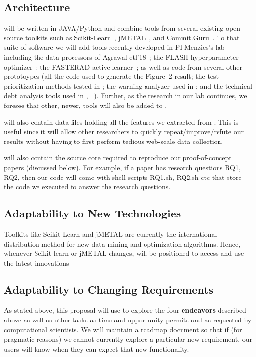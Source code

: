 \subsection{Architecture}   {\IT} will be written in JAVA/Python and 
combine tools from several existing open source toolkits such as 
Scikit-Learn~\cite{scikit-learn}, jMETAL~\cite{durillo2011jmetal}, and Commit.Guru~\cite{commitguru}.
To that suite of software we will add tools recently developed in PI Menzies's lab including
the data processors of Agrawal etl'18~\cite{agrawal2017better}; 
the FLASH hyperparameter  optimizer~\cite{nair2017flash};
the FASTERAD active learner~\cite{Yu:2018,Yu2019}; as well as code
from several other prototoypes (all the code used to generate the    Figure~2 result;
the test prioritization methods tested in ;  
the warning analyzer used in    ;  
and the technical debt analysis tools used in ,
~\cite{xia19}). Further, as the research in our lab continues,
we foresee that other, newer, tools will also be added to {\IT}.





{\IT} will also contain data files holding all the features we extracted from . This is useful
since it will allow other researchers to quickly repeat/improve/refute our results without having
to first perform tedious web-scale data collection.

{\IT} will also contain the source core required to reproduce 
our proof-of-concept papers (discussed below). For example, if  a  paper
has research questions RQ1, RQ2, then our code will come with shell scripts
 RQ1.sh, RQ2.sh etc that store the code we executed to answer the research questions.


\subsection{Adaptability to New Technologies} Toolkits like Scikit-Learn and jMETAL
  are currently the international distribution method
for new data mining and optimization
algorithms. Hence, whenever Scikit-learn or jMETAL changes, {\IT} will be positioned to access
and use the  latest innovations  

\subsection{Adaptability to Changing Requirements}
As stated above, this proposal will use {\IT} to explore the four {\bf endeavors}
described above as well as  other tasks as time and opportunity permits and as requested by computational scientists.
We will maintain a roadmap document so that if (for pragmatic reasons)
we cannot currently explore a particular new requirement,
our users will know when they can expect that new functionality.


